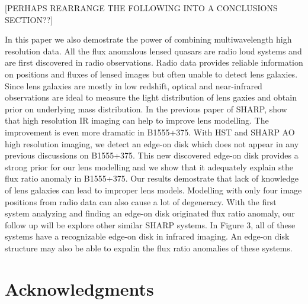 \documentclass[useAMS,usenatbib]{mn2e}
\begin{document}
[PERHAPS REARRANGE THE FOLLOWING INTO A CONCLUSIONS SECTION??]

In this paper we also demostrate the power of combining multiwavelength high resolution data. All the flux anomalous lensed quasars are radio loud systems and are first discovered in radio observations. Radio data provides reliable information on positions and fluxes of lensed images but often unable to detect lens galaxies. Since lens galaxies are mostly in low redshift, optical and near-infrared observations are ideal to measure the light distribution of lens gaxies and obtain prior on underlying mass distribution. In the previous paper of SHARP, \citet{SHARP12} show that high resolution IR imaging can help to improve lens modelling. The improvement is even more dramatic in B1555+375. With HST and SHARP AO high resolution imaging, we detect an edge-on disk which does not appear in any previous discussions on B1555+375. This new discovered edge-on disk provides a strong prior for our lens modelling and we show that it adequately explain sthe flux ratio anomaly in B1555+375. Our results demostrate that lack of knowledge of lens galaxies can lead to improper lens models. Modelling with only four image positions from radio data can also cause a lot of degeneracy. With the first system analyzing and finding an edge-on disk originated flux ratio anomaly, our follow up will be explore other similar SHARP systems. In Figure 3, all of these systems have a recognizable edge-on disk in infrared imaging. An edge-on disk structure may also be able to expalin the flux ratio anomalies of these systems.
 


\section*{Acknowledgments}







\label{lastpage}
\end{document}
